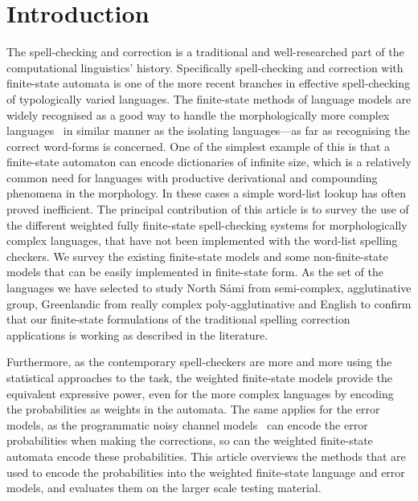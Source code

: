\documentclass[a4paper,12pt]{article}
\begin{document}
\section{Introduction} 

The spell-checking and correction is a traditional and well-researched part of
the computational linguistics' history. Specifically spell-checking and
correction with finite-state automata is one of the more recent branches in
effective spell-checking of typologically varied languages. The finite-state
methods of language models are widely recognised as a good way to handle the
morphologically more complex languages~\cite[]{beesley2003finite} in similar
manner as the isolating languages---as far as recognising the correct
word-forms is concerned. One of the simplest example of this is that a
finite-state automaton can encode dictionaries of infinite size, which is a
relatively common need for languages with productive derivational and
compounding phenomena in the morphology.  In these cases a simple word-list
lookup has often proved inefficient. The principal contribution of this article
is to survey the use of the different weighted fully finite-state
spell-checking systems for morphologically complex languages, that have not
been implemented with the word-list spelling checkers.  We survey the existing
finite-state models and some non-finite-state models that can be easily
implemented in finite-state form.  As the set of the languages we have selected
to study North Sámi from semi-complex, agglutinative group, Greenlandic from
really complex poly-agglutinative and English to confirm that our finite-state
formulations of the traditional spelling correction applications is working as
described in the literature.

Furthermore, as the contemporary spell-checkers are more and more using the
statistical approaches to the task, the weighted finite-state models provide
the equivalent expressive power, even for the more complex languages by
encoding the probabilities as weights in the automata.  The same applies for
the error models, as the programmatic noisy channel
models~\cite[]{brill2000improved} can encode the error probabilities when
making the corrections, so can the weighted finite-state automata encode these
probabilities. This article overviews the methods that are used to encode the
probabilities into the weighted finite-state language and error models, and
evaluates them on the larger scale testing material.
\end{document}
